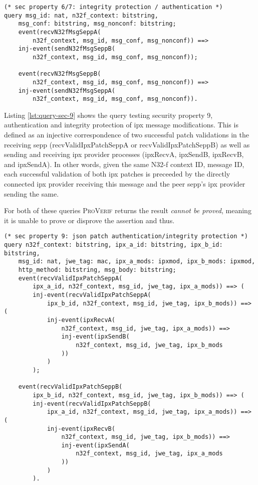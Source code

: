 \begin{lstlisting}[caption={Query for security property 6 and 7},label={lst:query-sec-6},firstnumber=221]
(* sec property 6/7: integrity protection / authentication *)
query msg_id: nat, n32f_context: bitstring,
    msg_conf: bitstring, msg_nonconf: bitstring;
    event(recvN32fMsgSeppA(
        n32f_context, msg_id, msg_conf, msg_nonconf)) ==>
    inj-event(sendN32fMsgSeppB(
        n32f_context, msg_id, msg_conf, msg_nonconf));

    event(recvN32fMsgSeppB(
        n32f_context, msg_id, msg_conf, msg_nonconf)) ==>
    inj-event(sendN32fMsgSeppA(
        n32f_context, msg_id, msg_conf, msg_nonconf)).
\end{lstlisting}

Listing \ref{lst:query-sec-9} shows the query testing security property 9, authentication and integrity protection of \gls{ipx} message modifications.
This is defined as an injective correspondence of two successful patch validations in the receiving \gls{sepp} ({\sffamily recvValidIpxPatchSeppA} or {\sffamily recvValidIpxPatchSeppB}) as well as sending and receiving \gls{ipx} provider processes ({\sffamily ipxRecvA}, {\sffamily ipxSendB}, {\sffamily ipxRecvB}, and {\sffamily ipxSendA}).
In other words, given the same N32-f context ID, message ID, each successful validation of both \gls{ipx} patches is preceeded by the directly connected \gls{ipx} provider receiving this message and the peer \gls{sepp}'s \gls{ipx} provider sending the same.

For both of these queries \textsc{ProVerif} returns the result \textit{cannot be proved}, meaning it is unable to prove or disprove the assertion and thus.

\begin{lstlisting}[caption={Query for security property 9},label={lst:query-sec-9},firstnumber=221]
(* sec property 9: json patch authentication/integrity protection *)
query n32f_context: bitstring, ipx_a_id: bitstring, ipx_b_id: bitstring,
    msg_id: nat, jwe_tag: mac, ipx_a_mods: ipxmod, ipx_b_mods: ipxmod,
    http_method: bitstring, msg_body: bitstring;
    event(recvValidIpxPatchSeppA(
        ipx_a_id, n32f_context, msg_id, jwe_tag, ipx_a_mods)) ==> (
        inj-event(recvValidIpxPatchSeppA(
            ipx_b_id, n32f_context, msg_id, jwe_tag, ipx_b_mods)) ==> (
            inj-event(ipxRecvA(
                n32f_context, msg_id, jwe_tag, ipx_a_mods)) ==>
                inj-event(ipxSendB(
                    n32f_context, msg_id, jwe_tag, ipx_b_mods
                ))
            )
        );

    event(recvValidIpxPatchSeppB(
        ipx_b_id, n32f_context, msg_id, jwe_tag, ipx_b_mods)) ==> (
        inj-event(recvValidIpxPatchSeppB(
            ipx_a_id, n32f_context, msg_id, jwe_tag, ipx_a_mods)) ==> (
            inj-event(ipxRecvB(
                n32f_context, msg_id, jwe_tag, ipx_b_mods)) ==>
                inj-event(ipxSendA(
                    n32f_context, msg_id, jwe_tag, ipx_a_mods
                ))
            )
        ).
\end{lstlisting}


